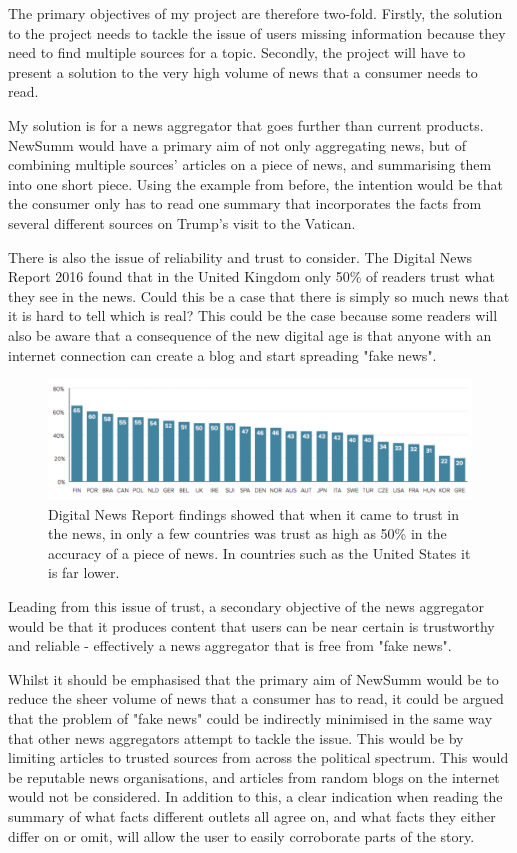 \documentclass[12pt]{article}
\begin{document}
The primary objectives of my project are therefore two-fold. Firstly, the solution to the project needs to tackle the issue of users missing information because they need to find multiple sources for a topic. Secondly, the project will have to present a solution to the very high volume of news that a consumer needs to read. 

My solution is for a news aggregator that goes further than current products. NewSumm would have a primary aim of not only aggregating news, but of combining multiple sources' articles on a piece of news, and summarising them into one short piece. Using the example from before, the intention would be that the consumer only has to read one summary that incorporates the facts from several different sources on Trump's visit to the Vatican.

There is also the issue of reliability and trust to consider. The Digital News Report 2016 found that in the United Kingdom only 50\% of readers trust what they see in the news. Could this be a case that there is simply so much news that it is hard to tell which is real? This could be the case because some readers will also be aware that a consequence of the new digital age is that anyone with an internet connection can create a blog and start spreading "fake news". 

\begin{figure}[h]
  \centering
    \includegraphics[width=\textwidth]{TrustInNews.png}
   \caption[The Digital News Report 2016 on trust in the news]{Digital News Report findings showed that when it came to trust in the news, in only a few countries was trust as high as 50\% in the accuracy of a piece of news. In countries such as the United States it is far lower.}
   \label{TrustInNews}
\end{figure}

Leading from this issue of trust, a secondary objective of the news aggregator would be that it produces content that users can be near certain is trustworthy and reliable - effectively a news aggregator that is free from "fake news".

Whilst it should be emphasised that the primary aim of NewSumm would be to reduce the sheer volume of news that a consumer has to read, it could be argued that the problem of "fake news" could be indirectly minimised in the same way that other news aggregators attempt to tackle the issue. This would be by limiting articles to trusted sources from across the political spectrum. This would be reputable news organisations, and articles from random blogs on the internet would not be considered. In addition to this, a clear indication when reading the summary of what facts different outlets all agree on, and what facts they either differ on or omit, will allow the user to easily corroborate parts of the story.
\end{document}
